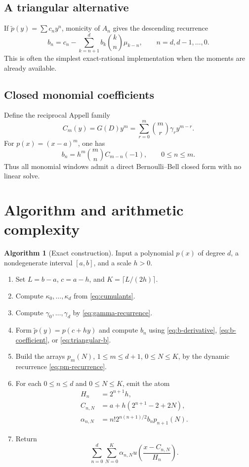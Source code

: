 \documentclass[11pt]{article}
\theoremstyle{definition}
\newtheorem{algorithm}[theorem]{Algorithm}
\theoremstyle{remark}
\newcommand{\1}{\mathbf{1}}
\begin{document}
\subsection{A triangular alternative}

If $\widetilde p(y)=\sum c_ny^n$, monicity of $A_n$ gives the descending
recurrence
\begin{equation}
 b_n=c_n-\sum_{k=n+1}^{d}b_k\binom{k}{n}\mu_{k-n},
 \qquad n=d,d-1,\ldots,0.
 \label{eq:triangular-b}
\end{equation}
This is often the simplest exact-rational implementation when the moments are
already available.

\subsection{Closed monomial coefficients}

Define the reciprocal Appell family
\begin{equation}
 C_m(y)=G(D)y^m
 =\sum_{r=0}^{m}\binom mr\gamma_r y^{m-r}.
 \label{eq:C-reciprocal-Appell}
\end{equation}
For $p(x)=(x-a)^m$, one has
\begin{equation}
 b_n=h^m\binom mn C_{m-n}(-1),
 \qquad 0\leq n\leq m.
 \label{eq:monomial-b}
\end{equation}
Thus all monomial windows admit a direct Bernoulli--Bell closed form with no
linear solve.

\section{Algorithm and arithmetic complexity}

\begin{algorithm}[Exact construction]
\label{alg:construction}
Input a polynomial $p(x)$ of degree $d$, a nondegenerate interval $[a,b]$, and
a scale $h>0$.

\begin{enumerate}
\item Set $L=b-a$, $c=a-h$, and $K=\lceil L/(2h)\rceil$.
\item Compute $\kappa_0,\ldots,\kappa_d$ from \eqref{eq:cumulants}.
\item Compute $\gamma_0,\ldots,\gamma_d$ by \eqref{eq:gamma-recurrence}.
\item Form $\widetilde p(y)=p(c+hy)$ and compute $b_n$ using
  \eqref{eq:b-derivative}, \eqref{eq:b-coefficient}, or
  \eqref{eq:triangular-b}.
\item Build the arrays $p_m(N)$, $1\leq m\leq d+1$, $0\leq N\leq K$, by the
  dynamic recurrence \eqref{eq:pm-recurrence}.
\item For each $0\leq n\leq d$ and $0\leq N\leq K$, emit the atom
\begin{align*}
 H_n&=2^{n+1}h,\\
 C_{n,N}&=a+h(2^{n+1}-2+2N),\\
 \alpha_{n,N}&=n!2^{n(n+1)/2}b_np_{n+1}(N).
\end{align*}
\item Return
\[
 \sum_{n=0}^{d}\sum_{N=0}^{K}
 \alpha_{n,N}u\!\left(\frac{x-C_{n,N}}{H_n}\right).
\]
\end{enumerate}
\end{algorithm}
\end{document}
